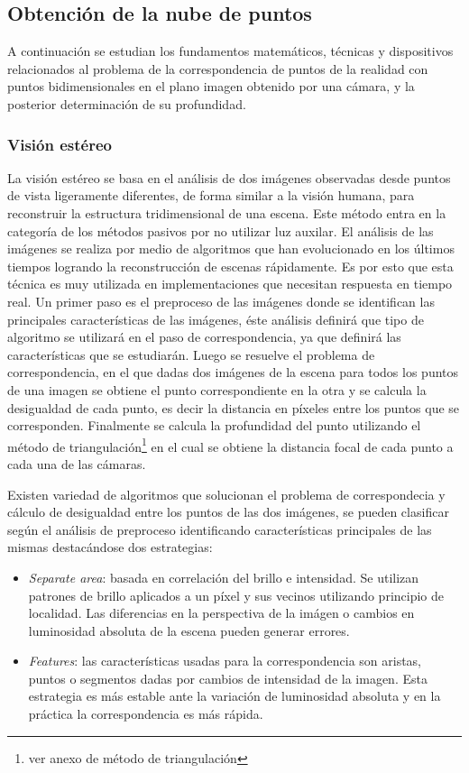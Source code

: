 \subsection{Obtención de la nube de puntos}

A continuación se estudian los fundamentos matemáticos, técnicas y dispositivos relacionados al problema de la correspondencia de puntos de la realidad con puntos bidimensionales en el plano imagen obtenido por una cámara, y la posterior determinación de su profundidad.

\subsubsection{Visión estéreo}

\cite{StereoReview} La visión estéreo se basa en el análisis de dos imágenes observadas desde puntos de vista ligeramente diferentes, de forma similar a la visión humana, para reconstruir la estructura tridimensional de una escena. Este método entra en la categoría de los métodos pasivos por no utilizar luz auxilar. El análisis de las imágenes se realiza por medio de algoritmos que han evolucionado en los últimos tiempos logrando la reconstrucción de escenas rápidamente. Es por esto que esta técnica es muy utilizada en implementaciones que necesitan respuesta en tiempo real.
Un primer paso es el preproceso de las imágenes donde se identifican las principales características de las imágenes, éste análisis definirá que tipo de algoritmo se utilizará en el paso de correspondencia, ya que definirá las características que se estudiarán. Luego se resuelve el problema de correspondencia, en el que dadas dos imágenes de la escena para todos los puntos de una imagen se obtiene el punto correspondiente en la otra y se calcula la desigualdad de cada punto, es decir la distancia en píxeles entre los puntos que se corresponden. Finalmente se calcula la profundidad del punto utilizando el método de triangulación\footnote{ver anexo de método de triangulación} en el cual se obtiene la distancia focal de cada punto a cada una de las cámaras.

Existen variedad de algoritmos que solucionan el problema de correspondecia y cálculo de desigualdad entre los puntos de las dos imágenes, se pueden clasificar según el análisis de preproceso identificando características principales de las mismas destacándose dos estrategias\cite{StructureFromStereo}:
\begin{itemize}
   \item \emph{Separate area}: basada en correlación del brillo e intensidad. Se utilizan patrones de brillo aplicados a un píxel y sus vecinos utilizando principio de localidad. Las diferencias en la perspectiva de la imágen o cambios en luminosidad absoluta de la escena pueden generar errores.
   \item \emph{Features}: las características usadas para la correspondencia son aristas, puntos o segmentos dadas por cambios de intensidad de la imagen. Esta estrategia es más estable ante la variación de luminosidad absoluta y en la práctica la correspondencia es más rápida.
\end{itemize}

